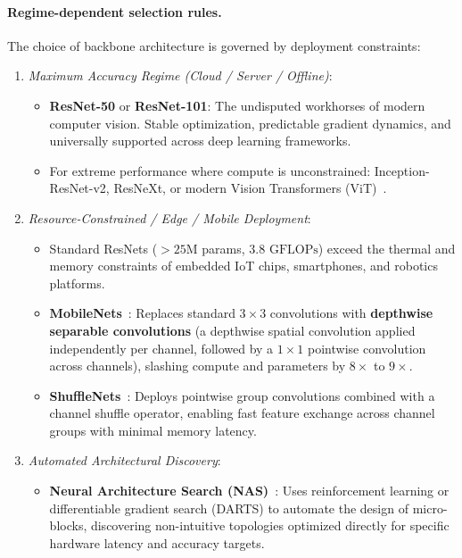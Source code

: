 \paragraph{Regime-dependent selection rules.}
The choice of backbone architecture is governed by deployment constraints:
\begin{enumerate}[leftmargin=*]
  \item \textit{Maximum Accuracy Regime (Cloud / Server / Offline)}:
    \begin{itemize}[noitemsep]
      \item \textbf{ResNet-50} or \textbf{ResNet-101}: The undisputed workhorses of modern computer vision. Stable optimization, predictable gradient dynamics, and universally supported across deep learning frameworks.
      \item For extreme performance where compute is unconstrained: Inception-ResNet-v2, ResNeXt, or modern Vision Transformers (ViT)~\cite{dosovitskiy2020image}.
    \end{itemize}
  \item \textit{Resource-Constrained / Edge / Mobile Deployment}:
    \begin{itemize}[noitemsep]
      \item Standard ResNets ($>25\text{M}$ params, $3.8\text{ GFLOPs}$) exceed the thermal and memory constraints of embedded IoT chips, smartphones, and robotics platforms.
      \item \textbf{MobileNets}~\cite{howard2017mobilenets}: Replaces standard $3 \times 3$ convolutions with \textbf{depthwise separable convolutions} (a depthwise spatial convolution applied independently per channel, followed by a $1 \times 1$ pointwise convolution across channels), slashing compute and parameters by $8\times$ to $9\times$.
      \item \textbf{ShuffleNets}~\cite{zhang2018shufflenet}: Deploys pointwise group convolutions combined with a channel shuffle operator, enabling fast feature exchange across channel groups with minimal memory latency.
    \end{itemize}
  \item \textit{Automated Architectural Discovery}:
    \begin{itemize}[noitemsep]
      \item \textbf{Neural Architecture Search (NAS)}~\cite{zoph2016neural}: Uses reinforcement learning or differentiable gradient search (DARTS) to automate the design of micro-blocks, discovering non-intuitive topologies optimized directly for specific hardware latency and accuracy targets.
    \end{itemize}
\end{enumerate}
